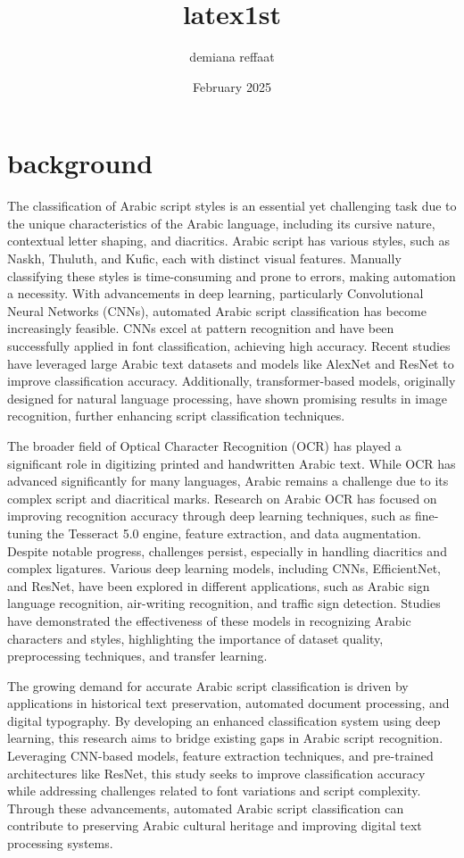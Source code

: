 \documentclass{article}
\title{latex1st}
\author{demiana reffaat}
\date{February 2025}
\begin{document}
\maketitle
\section{background}
The classification of Arabic script styles is an essential yet challenging task due to the unique characteristics of the Arabic language, including its cursive nature, contextual letter shaping, and diacritics. Arabic script has various styles, such as Naskh, Thuluth, and Kufic, each with distinct visual features. Manually classifying these styles is time-consuming and prone to errors, making automation a necessity. With advancements in deep learning, particularly Convolutional Neural Networks (CNNs), automated Arabic script classification has become increasingly feasible. CNNs excel at pattern recognition and have been successfully applied in font classification, achieving high accuracy. Recent studies have leveraged large Arabic text datasets and models like AlexNet and ResNet to improve classification accuracy. Additionally, transformer-based models, originally designed for natural language processing, have shown promising results in image recognition, further enhancing script classification techniques.  

The broader field of Optical Character Recognition (OCR) has played a significant role in digitizing printed and handwritten Arabic text. While OCR has advanced significantly for many languages, Arabic remains a challenge due to its complex script and diacritical marks. Research on Arabic OCR has focused on improving recognition accuracy through deep learning techniques, such as fine-tuning the Tesseract 5.0 engine, feature extraction, and data augmentation. Despite notable progress, challenges persist, especially in handling diacritics and complex ligatures. Various deep learning models, including CNNs, EfficientNet, and ResNet, have been explored in different applications, such as Arabic sign language recognition, air-writing recognition, and traffic sign detection. Studies have demonstrated the effectiveness of these models in recognizing Arabic characters and styles, highlighting the importance of dataset quality, preprocessing techniques, and transfer learning.  

The growing demand for accurate Arabic script classification is driven by applications in historical text preservation, automated document processing, and digital typography. By developing an enhanced classification system using deep learning, this research aims to bridge existing gaps in Arabic script recognition. Leveraging CNN-based models, feature extraction techniques, and pre-trained architectures like ResNet, this study seeks to improve classification accuracy while addressing challenges related to font variations and script complexity. Through these advancements, automated Arabic script classification can contribute to preserving Arabic cultural heritage and improving digital text processing systems.
\end{document}
